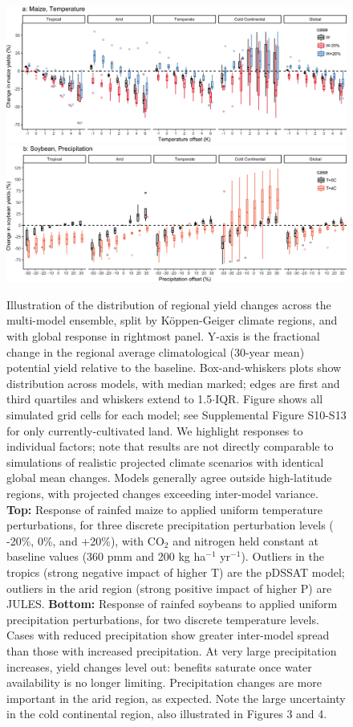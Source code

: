 \documentclass[gmd, manuscript]{copernicus} %
\begin{document}
\begin{figure}[ht]
  \centering
  \includegraphics[width=15cm]{figures/maize_sim_CG_T.png}
  \includegraphics[width=15cm]{figures/soy_sim_CG_W.png}
  \caption{
  Illustration of the distribution of regional yield changes across the multi-model ensemble, split by K\"{o}ppen-Geiger climate regions, and with global response in rightmost panel.
  Y-axis is the fractional change in the regional average climatological (30-year mean) potential yield relative to the baseline.
  Box-and-whiskers plots show distribution across models, with median marked; edges are first and third quartiles and whiskers extend to 1.5$\cdot$IQR.
  Figure shows all simulated grid cells for each model; see Supplemental Figure S10-S13 for only currently-cultivated land. We highlight responses to individual factors; note that results are not directly comparable to simulations of realistic projected climate scenarios with identical global mean changes.  
  Models generally agree outside high-latitude regions, with projected changes exceeding inter-model variance.
  \textbf{Top:} Response of rainfed maize to applied uniform temperature perturbations, for three discrete precipitation perturbation levels ( -20\%, 0\%, and +20\%), with CO$_2$ and nitrogen held constant at baseline values (360 pmm and 200 kg ha$^{-1}$ yr$^{-1}$).
  Outliers in the tropics (strong negative impact of higher T) are the pDSSAT model; outliers in the arid region (strong positive impact of higher P) are JULES.
  \textbf{Bottom:} 
  Response of rainfed soybeans to applied uniform precipitation perturbations, for two discrete temperature levels.
  Cases with reduced precipitation show greater inter-model spread than those with increased precipitation.
  At very large precipitation increases, yield changes level out: benefits saturate once water availability is no longer limiting.
  Precipitation changes are more important in the arid region, as expected. 
  Note the large uncertainty in the cold continental region, also illustrated in Figures 3 and 4.
  }
  \label{fig:maizerice}
\end{figure}
\end{document}
